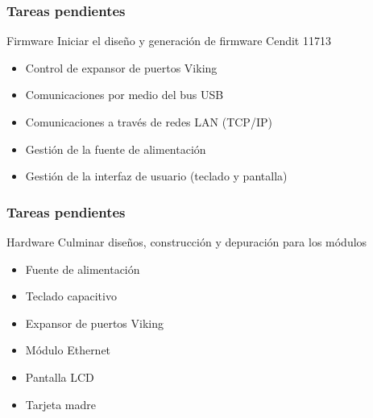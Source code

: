 \documentclass[xcolor=pdftext, table]{beamer}
\begin{document}
	\begin{frame}
	
	\frametitle{Tareas pendientes}		
	
		\begin{block}{Firmware}
			Iniciar el diseño y generación de firmware Cendit 11713
			\begin{itemize}
				\item Control de expansor de puertos Viking
				\item Comunicaciones por medio del bus USB
				\item Comunicaciones a través de redes LAN (TCP/IP)
				\item Gestión de la fuente de alimentación
				\item Gestión de la interfaz de usuario (teclado y pantalla)
			\end{itemize}
		\end{block}

	\end{frame}	

	\begin{frame}
		\frametitle{Tareas pendientes}			
	
		\begin{block}{Hardware}
			Culminar diseños, construcción y depuración para los módulos 
			\begin{itemize}
				\item Fuente de alimentación
				\item Teclado capacitivo
				\item Expansor de puertos Viking 
				\item Módulo Ethernet
				\item Pantalla LCD	
				\item Tarjeta madre				
			\end{itemize}
		\end{block}
	
	\end{frame}
\end{document}
